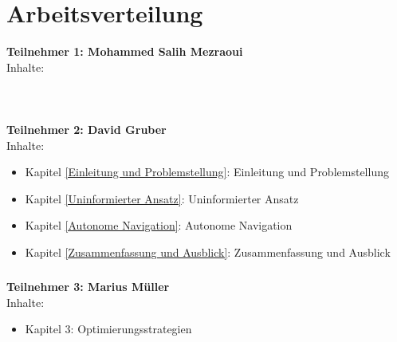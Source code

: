 \chapter*{Arbeitsverteilung}

\textbf{Teilnehmer 1: Mohammed Salih Mezraoui} 
\\
 Inhalte:
\\
\\
\\
\\
\textbf{Teilnehmer 2: David Gruber} 
\\
Inhalte: 
\begin{itemize}
    \item Kapitel \ref{Einleitung und Problemstellung}: Einleitung und Problemstellung
    \item Kapitel \ref{Uninformierter Ansatz}: Uninformierter Ansatz
    \item Kapitel \ref{Autonome Navigation}: Autonome Navigation
    \item Kapitel \ref{Zusammenfassung und Ausblick}: Zusammenfassung und Ausblick
\end{itemize}
\paragraph*{}
\textbf{Teilnehmer 3: Marius Müller} 
\\
 Inhalte: 
\begin{itemize}
	\item Kapitel 3: Optimierungsstrategien
\end{itemize}